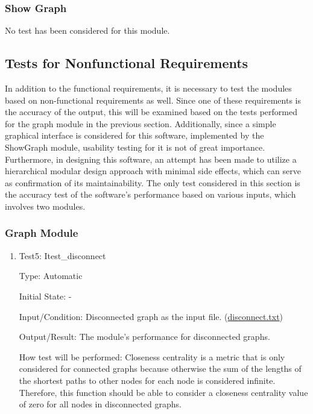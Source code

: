 \documentclass[12pt, titlepage]{article}
\begin{document}
\subsubsection{Show Graph}
No test has been considered for this module.

\subsection{Tests for Nonfunctional Requirements}

In addition to the functional requirements, it is necessary to test the modules based on non-functional requirements as well. Since one of these requirements is the accuracy of the output, this will be examined based on the tests performed for the graph module in the previous section. Additionally, since a simple graphical interface is considered for this software, implemented by the ShowGraph module, usability testing for it is not of great importance. Furthermore, in designing this software, an attempt has been made to utilize a hierarchical modular design approach with minimal side effects, which can serve as confirmation of its maintainability. The only test considered in this section is the accuracy test of the software's performance based on various inputs, which involves two modules.
		

\subsubsection{Graph Module}
\begin{enumerate}
\item{Test5: Itest\_disconnect\\}

Type: Automatic
					
Initial State: -
					
Input/Condition: Disconnected graph as the input file. (\href{https://github.com/AtiyehSayadi/Centrality-In-Graphs/tree/main/test/disconnect.txt}{disconnect.txt})
					
Output/Result:  The module's performance for disconnected graphs.
					
How test will be performed: Closeness centrality is a metric that is only considered for connected graphs because otherwise the sum of the lengths of the shortest paths to other nodes for each node is considered infinite. Therefore, this function should be able to consider a closeness centrality value of zero for all nodes in disconnected graphs.
 \end{enumerate}
\end{document}
